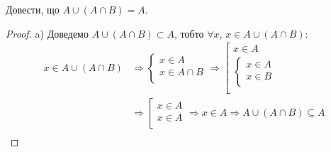 \begin{example}
    Довести, що $A \cup (A \cap B) = A$.

    \begin{proof}
        a) Доведемо $A \cup (A \cap B) \subset A$, тобто $\forall x$, $x \in A \cup (A \cap B)$:
        \begin{equation*}
            \begin{split}
                x \in A \cup (A \cap B)
                & \Rightarrow \left\{ \begin{array}{l}
                    x \in A  \\
                    x \in A \cap B  \\
                \end{array} \right.
                \Rightarrow \left[ \begin{array}{l}
                    x \in A  \\
                    \left\{ \begin{array}{l}
                        x \in A  \\
                        x \in B  \\
                    \end{array} \right.  \\
                \end{array} \right.  \\
                & \Rightarrow \left[ \begin{array}{l}
                    x \in A  \\
                    x \in A  \\
                \end{array} \right.
                \Rightarrow x \in A
                \Rightarrow A \cup (A \cap B) \subseteq A  \\
            \end{split}
        \end{equation*}


\end{proof}
\end{example}
